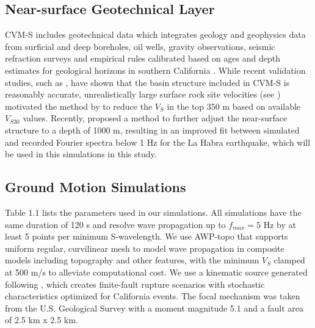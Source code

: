 \subsection{Near-surface Geotechnical Layer}
CVM-S includes geotechnical data which integrates geology and geophysics data from surficial and deep boreholes, oil wells, gravity observations, seismic refraction surveys and empirical rules calibrated based on ages and depth estimates for geological horizons in southern California \citep{magistraleGeologybased3DVelocity1996,magistraleSCECSouthernCalifornia2000}. While recent validation studies, such as \citet{tabordaEvaluationSouthernCalifornia2016}, have shown that the basin structure included in CVM-S is reasonably accurate, unrealistically large surface rock site velocities (see ) motivated the method by \citet{elyVs30derivedNearsurfaceSeismic2010} to reduce the $V_S$ in the top 350 m based on available $V_{S30}$ values. Recently, \citet{huCalibrationNearsurfaceSeismic2021} proposed a method to further adjust the near-surface structure to a depth of 1000 m, resulting in an improved fit between simulated and recorded Fourier spectra below 1 Hz for the La Habra earthquake, which will be used in this simulations in this study.

\subsection{Ground Motion Simulations}
Table 1.1 lists the parameters used in our simulations. All simulations have the same duration of 120 s and resolve wave propagation up to $f_{max}=5$ Hz by at least 5 points per minimum S-wavelength. We use AWP-topo that supports uniform regular, curvilinear mesh to model wave propagation in composite models including topography and other features, with the minimum $V_S$ clamped at 500 m/s to alleviate computational cost. We use a kinematic source generated following \citet{gravesKinematicGroundMotion2016}, which creates finite-fault rupture scenarios with stochastic characteristics optimized for California events. The focal mechanism was taken from the U.S. Geological Survey \citep[strike=233$^\circ$, dip=77$^\circ$, rake=49$^\circ$; ][]{usgsEarthquakeEventsFocal2014} with a moment magnitude 5.1 and a fault area of 2.5 km x 2.5 km. %



